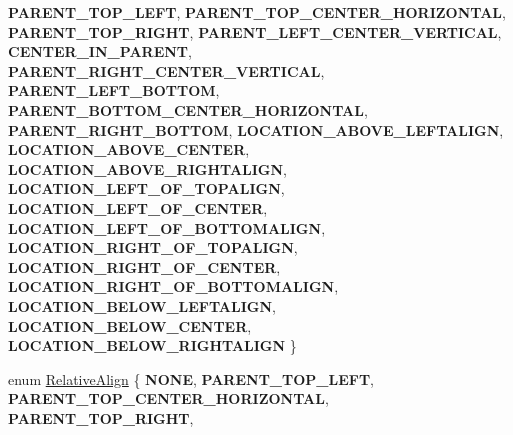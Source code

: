 \begin{DoxyCompactItemize}
{\bfseries P\+A\+R\+E\+N\+T\+\_\+\+T\+O\+P\+\_\+\+L\+E\+FT}, 
\newline
{\bfseries P\+A\+R\+E\+N\+T\+\_\+\+T\+O\+P\+\_\+\+C\+E\+N\+T\+E\+R\+\_\+\+H\+O\+R\+I\+Z\+O\+N\+T\+AL}, 
{\bfseries P\+A\+R\+E\+N\+T\+\_\+\+T\+O\+P\+\_\+\+R\+I\+G\+HT}, 
{\bfseries P\+A\+R\+E\+N\+T\+\_\+\+L\+E\+F\+T\+\_\+\+C\+E\+N\+T\+E\+R\+\_\+\+V\+E\+R\+T\+I\+C\+AL}, 
{\bfseries C\+E\+N\+T\+E\+R\+\_\+\+I\+N\+\_\+\+P\+A\+R\+E\+NT}, 
\newline
{\bfseries P\+A\+R\+E\+N\+T\+\_\+\+R\+I\+G\+H\+T\+\_\+\+C\+E\+N\+T\+E\+R\+\_\+\+V\+E\+R\+T\+I\+C\+AL}, 
{\bfseries P\+A\+R\+E\+N\+T\+\_\+\+L\+E\+F\+T\+\_\+\+B\+O\+T\+T\+OM}, 
{\bfseries P\+A\+R\+E\+N\+T\+\_\+\+B\+O\+T\+T\+O\+M\+\_\+\+C\+E\+N\+T\+E\+R\+\_\+\+H\+O\+R\+I\+Z\+O\+N\+T\+AL}, 
{\bfseries P\+A\+R\+E\+N\+T\+\_\+\+R\+I\+G\+H\+T\+\_\+\+B\+O\+T\+T\+OM}, 
\newline
{\bfseries L\+O\+C\+A\+T\+I\+O\+N\+\_\+\+A\+B\+O\+V\+E\+\_\+\+L\+E\+F\+T\+A\+L\+I\+GN}, 
{\bfseries L\+O\+C\+A\+T\+I\+O\+N\+\_\+\+A\+B\+O\+V\+E\+\_\+\+C\+E\+N\+T\+ER}, 
{\bfseries L\+O\+C\+A\+T\+I\+O\+N\+\_\+\+A\+B\+O\+V\+E\+\_\+\+R\+I\+G\+H\+T\+A\+L\+I\+GN}, 
{\bfseries L\+O\+C\+A\+T\+I\+O\+N\+\_\+\+L\+E\+F\+T\+\_\+\+O\+F\+\_\+\+T\+O\+P\+A\+L\+I\+GN}, 
\newline
{\bfseries L\+O\+C\+A\+T\+I\+O\+N\+\_\+\+L\+E\+F\+T\+\_\+\+O\+F\+\_\+\+C\+E\+N\+T\+ER}, 
{\bfseries L\+O\+C\+A\+T\+I\+O\+N\+\_\+\+L\+E\+F\+T\+\_\+\+O\+F\+\_\+\+B\+O\+T\+T\+O\+M\+A\+L\+I\+GN}, 
{\bfseries L\+O\+C\+A\+T\+I\+O\+N\+\_\+\+R\+I\+G\+H\+T\+\_\+\+O\+F\+\_\+\+T\+O\+P\+A\+L\+I\+GN}, 
{\bfseries L\+O\+C\+A\+T\+I\+O\+N\+\_\+\+R\+I\+G\+H\+T\+\_\+\+O\+F\+\_\+\+C\+E\+N\+T\+ER}, 
\newline
{\bfseries L\+O\+C\+A\+T\+I\+O\+N\+\_\+\+R\+I\+G\+H\+T\+\_\+\+O\+F\+\_\+\+B\+O\+T\+T\+O\+M\+A\+L\+I\+GN}, 
{\bfseries L\+O\+C\+A\+T\+I\+O\+N\+\_\+\+B\+E\+L\+O\+W\+\_\+\+L\+E\+F\+T\+A\+L\+I\+GN}, 
{\bfseries L\+O\+C\+A\+T\+I\+O\+N\+\_\+\+B\+E\+L\+O\+W\+\_\+\+C\+E\+N\+T\+ER}, 
{\bfseries L\+O\+C\+A\+T\+I\+O\+N\+\_\+\+B\+E\+L\+O\+W\+\_\+\+R\+I\+G\+H\+T\+A\+L\+I\+GN}
 \}
\item 
enum \hyperlink{classui_1_1RelativeLayoutParameter_a40283d09524c58e61741de3288e6769d}{Relative\+Align} \{ \newline
{\bfseries N\+O\+NE}, 
{\bfseries P\+A\+R\+E\+N\+T\+\_\+\+T\+O\+P\+\_\+\+L\+E\+FT}, 
{\bfseries P\+A\+R\+E\+N\+T\+\_\+\+T\+O\+P\+\_\+\+C\+E\+N\+T\+E\+R\+\_\+\+H\+O\+R\+I\+Z\+O\+N\+T\+AL}, 
{\bfseries P\+A\+R\+E\+N\+T\+\_\+\+T\+O\+P\+\_\+\+R\+I\+G\+HT}, 
\newline

\end{DoxyCompactItemize}
